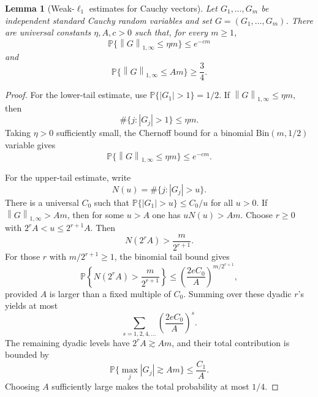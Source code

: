 \documentclass[11pt]{article}
\newtheorem{lemma}[theorem]{Lemma}
\newcommand{\Pbb}{\mathbb P}
\newcommand{\norm}[1]{\left\lVert #1 \right\rVert}
\newcommand{\abs}[1]{\left\lvert #1 \right\rvert}
\begin{document}
\begin{lemma}[Weak-\(\ell_1\) estimates for Cauchy vectors]
\label{lem:cauchy-weak}
Let \(G_1,\ldots,G_m\) be independent standard Cauchy random variables and set
\(G=(G_1,\ldots,G_m)\).  There are universal constants
\(\eta,A,c>0\) such that, for every \(m\ge 1\),
\[
  \Pbb\{\norm{G}_{1,\infty}\le \eta m\}\le e^{-cm}
\]
and
\[
  \Pbb\{\norm{G}_{1,\infty}\le A m\}\ge \frac34 .
\]
\end{lemma}

\begin{proof}
For the lower-tail estimate, use
\(\Pbb\{\abs{G_1}>1\}=1/2\).  If \(\norm{G}_{1,\infty}\le \eta m\), then
\[
  \#\{j:\abs{G_j}>1\}\le \eta m.
\]
Taking \(\eta>0\) sufficiently small, the Chernoff bound for a binomial
\(\mathrm{Bin}(m,1/2)\) variable gives
\[
  \Pbb\{\norm{G}_{1,\infty}\le \eta m\}\le e^{-cm}.
\]

For the upper-tail estimate, write
\[
  N(u)=\#\{j:\abs{G_j}>u\}.
\]
There is a universal \(C_0\) such that
\(\Pbb\{\abs{G_1}>u\}\le C_0/u\) for all \(u>0\).  If
\(\norm{G}_{1,\infty}>A m\), then for some \(u>A\) one has
\(uN(u)>A m\).  Choose \(r\ge 0\) with
\(2^r A<u\le 2^{r+1}A\).  Then
\[
  N(2^r A)> \frac{m}{2^{r+1}}.
\]
For those \(r\) with \(m/2^{r+1}\ge 1\), the binomial tail bound gives
\[
\Pbb\left\{N(2^r A)> \frac{m}{2^{r+1}}\right\}
\le
\left(\frac{2eC_0}{A}\right)^{m/2^{r+1}},
\]
provided \(A\) is larger than a fixed multiple of \(C_0\).  Summing over these
dyadic \(r\)'s yields at most
\[
  \sum_{s=1,2,4,\ldots}\left(\frac{2eC_0}{A}\right)^s.
\]
The remaining dyadic levels have \(2^rA\gtrsim Am\), and their total
contribution is bounded by
\[
  \Pbb\{\max_j \abs{G_j}\gtrsim A m\}\le \frac{C_1}{A}.
\]
Choosing \(A\) sufficiently large makes the total probability at most \(1/4\).
\end{proof}
\end{document}
